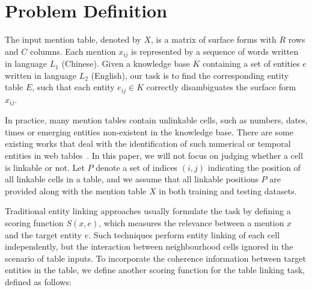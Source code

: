 \section{Problem Definition}
\label{sec:problem}


The input mention table, denoted by $X$,
is a matrix of surface forms with $R$ rows and $C$ columns.
Each mention $x_{ij}$ is represented by a sequence of words
written in language $L_1$ (Chinese).
Given a knowledge base $K$ containing a set of entities $e$ written in language $L_2$ (English),
our task is to find the corresponding entity table $E$,
such that each entity $e_{ij} \in K$ correctly disambiguates the surface form $x_{ij}$. 

In practice, many mention tables contain unlinkable cells,
such as numbers, dates, times or emerging entities non-existent in the knowledge base.
There are some existing works that deal with the identification of
such numerical or temporal entities in web tables~\cite{ibrahim2016making}. 
In this paper, we will not focus on judging whether a cell is linkable or not.
Let $P$ denote a set of indices $(i, j)$
indicating the position of all linkable cells in a table,
and we assume that all linkable positions $P$ are provided along 
with the mention table $X$ in both training and testing datasets.

Traditional entity linking approaches
usually formulate the task by defining a scoring function $S(x, e)$,
which measures the relevance between a mention $x$ and the target entity $e$.
Such techniques perform entity linking of each cell independently,
but the interaction between neighbourhood cells ignored in the scenario of table inputs.
To incorporate the coherence information between target entities in the table,
we define another scoring function for the table linking task, defined as follows:

